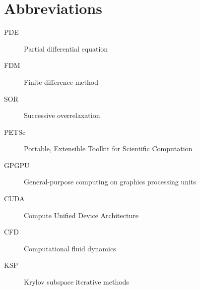\chapter{Abbreviations}

\begin{description}
	\item[PDE] Partial differential equation
	\item[FDM] Finite difference method
	\item[SOR] Successive overrelaxation
	\item[PETSc] Portable, Extensible Toolkit for Scientific Computation
	\item[GPGPU] General-purpose computing on graphics processing units
	\item[CUDA] Compute Unified Device Architecture
	\item[CFD] Computational fluid dynamics
	\item[KSP] Krylov subspace iterative methods
\end{description}
